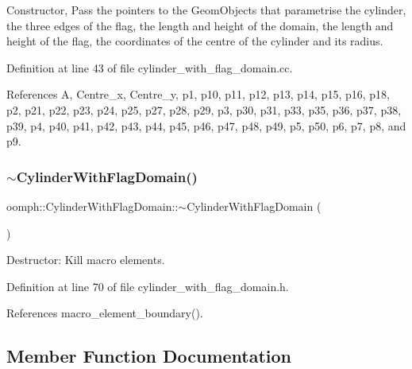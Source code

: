 Constructor, Pass the pointers to the Geom\+Objects that parametrise the cylinder, the three edges of the flag, the length and height of the domain, the length and height of the flag, the coordinates of the centre of the cylinder and its radius. 

Definition at line 43 of file cylinder\+\_\+with\+\_\+flag\+\_\+domain.\+cc.



References A, Centre\+\_\+x, Centre\+\_\+y, p1, p10, p11, p12, p13, p14, p15, p16, p18, p2, p21, p22, p23, p24, p25, p27, p28, p29, p3, p30, p31, p33, p35, p36, p37, p38, p39, p4, p40, p41, p42, p43, p44, p45, p46, p47, p48, p49, p5, p50, p6, p7, p8, and p9.

\mbox{\label{classoomph_1_1CylinderWithFlagDomain_a726928362d0d681f0420d1f088776e80}} 
\subsubsection{\texorpdfstring{$\sim$\+Cylinder\+With\+Flag\+Domain()}{~CylinderWithFlagDomain()}}
{\footnotesize\ttfamily oomph\+::\+Cylinder\+With\+Flag\+Domain\+::$\sim$\+Cylinder\+With\+Flag\+Domain (\begin{DoxyParamCaption}{ }\end{DoxyParamCaption})\hspace{0.3cm}{\ttfamily [inline]}}



Destructor\+: Kill macro elements. 



Definition at line 70 of file cylinder\+\_\+with\+\_\+flag\+\_\+domain.\+h.



References macro\+\_\+element\+\_\+boundary().



\subsection{Member Function Documentation}
\mbox{\label{classoomph_1_1CylinderWithFlagDomain_a4da493b4e9ddc3fc62f6beb269781e81}} 
